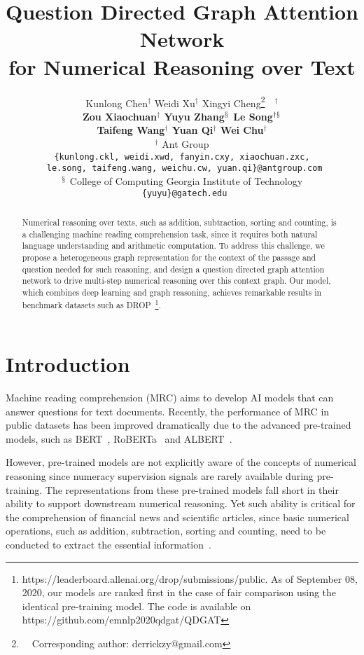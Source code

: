 \documentclass{article}
\title{Question Directed Graph Attention Network \\ for Numerical Reasoning over Text}
\author{Kunlong Chen$^{\dagger}$ \quad Weidi Xu$^{\dagger}$ \quad Xingyi Cheng\thanks{~~Corresponding author: derrickzy@gmail.com}~~$^{\dagger}$  \\ { \bf  Zou Xiaochuan$^{\dagger}$ \quad Yuyu Zhang$^{\mathsection}$ \quad Le Song$^{\dagger\mathsection}$ } \\ { \bf Taifeng Wang$^{\dagger}$ \quad Yuan Qi$^{\dagger}$  \quad Wei Chu$^{\dagger}$ } \\
$^{\dagger}$ Ant Group \\
{\tt  \{kunlong.ckl, weidi.xwd, fanyin.cxy, xiaochuan.zxc,} \\
{\tt
le.song, taifeng.wang, weichu.cw, yuan.qi\}@antgroup.com} \\
$^{\mathsection}$ College of Computing Georgia Institute of Technology \\
{\tt
\{yuyu\}@gatech.edu}
}
\date{}
\begin{document}
\maketitle

\begin{abstract}
Numerical reasoning over texts, such as addition, subtraction, sorting and counting, is a challenging machine reading comprehension task, since it requires both natural language understanding and arithmetic computation. 
To address this challenge, we propose a heterogeneous graph representation for the context of the passage and question needed for such reasoning, and design a question directed graph attention network to drive multi-step numerical reasoning over this context graph. 
Our model, which combines deep learning and graph reasoning, achieves remarkable results in benchmark datasets such as DROP~\footnote{{https://leaderboard.allenai.org/drop/submissions/public}. As of September 08, 2020, our models are ranked first in the case of fair comparison using the identical pre-training model. The code is available on https://github.com/emnlp2020qdgat/QDGAT}. 

\end{abstract}

\section{Introduction}

\setlength{\abovedisplayskip}{4pt}
\setlength{\abovedisplayshortskip}{1pt}
\setlength{\belowdisplayskip}{4pt}
\setlength{\belowdisplayshortskip}{1pt}






Machine reading comprehension (MRC) aims to develop AI models that can answer questions for text documents. 
Recently, the performance of MRC in public datasets has been improved dramatically due to the advanced pre-trained models, such as BERT~\cite{devlin-etal-2019-bert}, RoBERTa~\cite{DBLP:journals/corr/abs-1907-11692} and ALBERT~\cite{DBLP:journals/corr/abs-1909-11942}.

However, pre-trained models are not explicitly aware of the concepts of numerical reasoning since numeracy supervision signals are rarely available during pre-training. 
The representations from these pre-trained models fall short in their ability to support downstream numerical reasoning.  
Yet such ability is critical for the comprehension of financial news and scientific articles, since basic numerical operations, such as addition, subtraction, sorting and counting, need to be conducted to extract the essential information~\cite{DBLP:conf/naacl/DuaWDSS019}.
\end{document}
